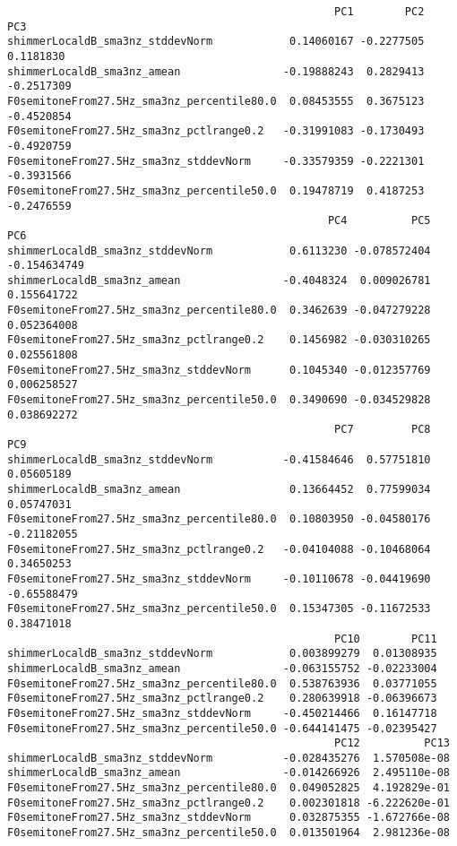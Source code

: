 \documentclass[
  letterpaper,
  DIV=11,
  numbers=noendperiod]{scrartcl}
\begin{document}
\begin{verbatim}
                                                   PC1        PC2        PC3
shimmerLocaldB_sma3nz_stddevNorm            0.14060167 -0.2277505  0.1181830
shimmerLocaldB_sma3nz_amean                -0.19888243  0.2829413 -0.2517309
F0semitoneFrom27.5Hz_sma3nz_percentile80.0  0.08453555  0.3675123 -0.4520854
F0semitoneFrom27.5Hz_sma3nz_pctlrange0.2   -0.31991083 -0.1730493 -0.4920759
F0semitoneFrom27.5Hz_sma3nz_stddevNorm     -0.33579359 -0.2221301 -0.3931566
F0semitoneFrom27.5Hz_sma3nz_percentile50.0  0.19478719  0.4187253 -0.2476559
                                                  PC4          PC5          PC6
shimmerLocaldB_sma3nz_stddevNorm            0.6113230 -0.078572404 -0.154634749
shimmerLocaldB_sma3nz_amean                -0.4048324  0.009026781  0.155641722
F0semitoneFrom27.5Hz_sma3nz_percentile80.0  0.3462639 -0.047279228  0.052364008
F0semitoneFrom27.5Hz_sma3nz_pctlrange0.2    0.1456982 -0.030310265  0.025561808
F0semitoneFrom27.5Hz_sma3nz_stddevNorm      0.1045340 -0.012357769  0.006258527
F0semitoneFrom27.5Hz_sma3nz_percentile50.0  0.3490690 -0.034529828  0.038692272
                                                   PC7         PC8         PC9
shimmerLocaldB_sma3nz_stddevNorm           -0.41584646  0.57751810  0.05605189
shimmerLocaldB_sma3nz_amean                 0.13664452  0.77599034  0.05747031
F0semitoneFrom27.5Hz_sma3nz_percentile80.0  0.10803950 -0.04580176 -0.21182055
F0semitoneFrom27.5Hz_sma3nz_pctlrange0.2   -0.04104088 -0.10468064  0.34650253
F0semitoneFrom27.5Hz_sma3nz_stddevNorm     -0.10110678 -0.04419690 -0.65588479
F0semitoneFrom27.5Hz_sma3nz_percentile50.0  0.15347305 -0.11672533  0.38471018
                                                   PC10        PC11
shimmerLocaldB_sma3nz_stddevNorm            0.003899279  0.01308935
shimmerLocaldB_sma3nz_amean                -0.063155752 -0.02233004
F0semitoneFrom27.5Hz_sma3nz_percentile80.0  0.538763936  0.03771055
F0semitoneFrom27.5Hz_sma3nz_pctlrange0.2    0.280639918 -0.06396673
F0semitoneFrom27.5Hz_sma3nz_stddevNorm     -0.450214466  0.16147718
F0semitoneFrom27.5Hz_sma3nz_percentile50.0 -0.644141475 -0.02395427
                                                   PC12          PC13
shimmerLocaldB_sma3nz_stddevNorm           -0.028435276  1.570508e-08
shimmerLocaldB_sma3nz_amean                -0.014266926  2.495110e-08
F0semitoneFrom27.5Hz_sma3nz_percentile80.0  0.049052825  4.192829e-01
F0semitoneFrom27.5Hz_sma3nz_pctlrange0.2    0.002301818 -6.222620e-01
F0semitoneFrom27.5Hz_sma3nz_stddevNorm      0.032875355 -1.672766e-08
F0semitoneFrom27.5Hz_sma3nz_percentile50.0  0.013501964  2.981236e-08
\end{verbatim}
\end{document}
